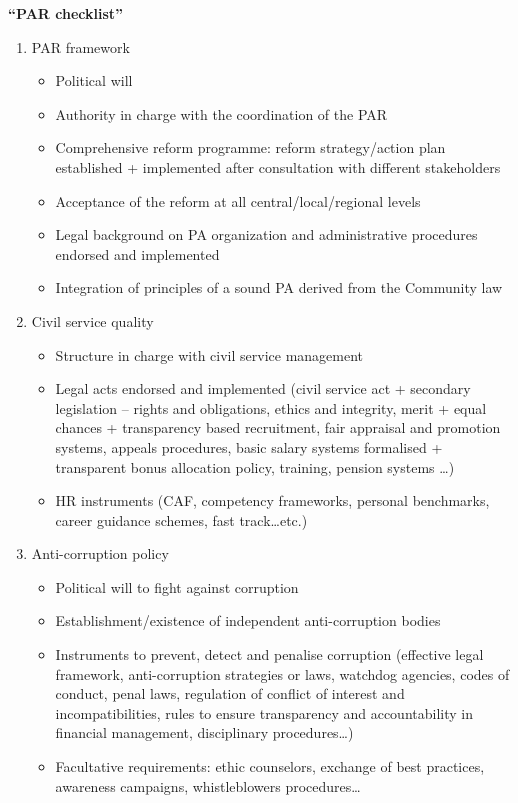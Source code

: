 {\bf “PAR checklist”}
\label{sub:par checklist}
\begin{enumerate}
\item PAR framework 
\begin{itemize} \itemsep1pt \parskip0pt 
\item Political will
\item Authority in charge with the coordination of the PAR
\item Comprehensive reform programme: reform strategy/action plan established + implemented after consultation with different stakeholders
\item Acceptance of the reform at all central/local/regional levels
\item Legal background on PA organization and administrative procedures endorsed and implemented
\item Integration of principles of a sound PA derived from the Community law
\end{itemize}
\item Civil service quality
\begin{itemize} \itemsep1pt \parskip0pt 
\item Structure in charge with civil service management
\item Legal acts endorsed and implemented (civil service act + secondary legislation – rights and obligations, ethics and integrity, merit + equal chances + transparency based recruitment, fair appraisal and promotion systems, appeals procedures, basic salary systems formalised + transparent bonus allocation policy, training, pension systems …)
\item HR instruments (CAF, competency frameworks, personal benchmarks, career guidance schemes, fast track…etc.)
\end{itemize}
\item Anti-corruption policy
\begin{itemize} \itemsep1pt \parskip0pt 
\item Political will to fight against corruption
\item Establishment/existence of independent anti-corruption bodies
\item Instruments to prevent, detect and penalise corruption (effective legal framework, anti-corruption strategies or laws, watchdog agencies, codes of conduct, penal laws, regulation of conflict of interest and incompatibilities, rules to ensure transparency and accountability in financial management, disciplinary procedures…)
\item Facultative requirements: ethic counselors, exchange of best practices, awareness campaigns, whistleblowers procedures…

\end{itemize}
\end{enumerate}
